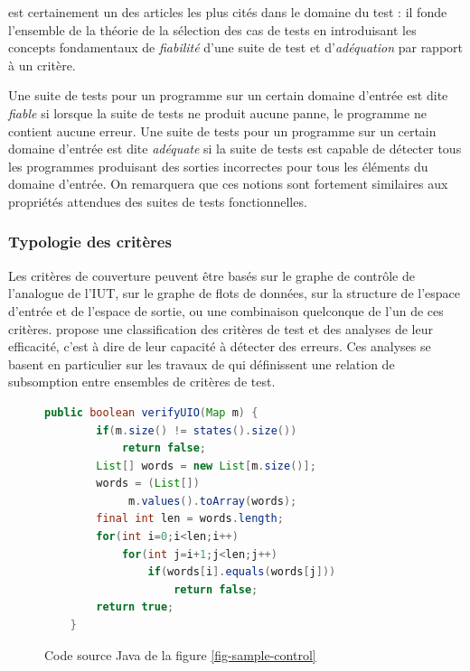 \cite{goodenough-test-selection} est certainement un des articles les
plus cit\'es dans le domaine du test : il fonde l'ensemble de la
th\'eorie de la s\'election des cas de tests en introduisant les
concepts fondamentaux de \emph{fiabilit\'e} d'une suite de test et
d'\emph{ad\'equation}  par rapport \`a un crit\`ere. 

Une suite de tests pour un programme sur un certain domaine
d'entr\'ee est dite \emph{fiable} si lorsque la suite de tests ne
produit aucune panne, le programme ne contient aucune erreur. 
Une suite de tests pour un programme sur un certain domaine
d'entr\'ee  est dite \emph{ad\'equate} si la suite de tests est capable
de d\'etecter tous les programmes produisant des sorties incorrectes
pour tous les \'el\'ements du domaine d'entr\'ee. On remarquera que
ces notions sont fortement similaires aux propri\'et\'es attendues
des suites de tests fonctionnelles.

\subsubsection{Typologie des crit\`eres}

Les crit\`eres de couverture peuvent \^etre bas\'es sur le graphe
de contr\^ole de l'analogue de l'\textsf{IUT}, sur le graphe de flots de
donn\'ees, sur la structure de l'espace d'entr\'ee et de l'espace de
sortie, ou une combinaison quelconque de l'un de ces crit\`eres.
\cite{zhu-coverage} propose une classification des crit\`eres de test
et des analyses de leur efficacit\'e, c'est \`a dire de leur
capacit\'e \`a d\'etecter des erreurs. Ces analyses se basent en
particulier sur les travaux de \cite{faultdetect} qui d\'efinissent
une relation de subsomption entre ensembles de crit\`eres de test. 

\begin{figure}
    \centering
\begin{lstlisting}[linewidth=.45\textwidth,language=Java]
    public boolean verifyUIO(Map m) {
        if(m.size() != states().size())
            return false;
        List[] words = new List[m.size()];
        words = (List[]) 
             m.values().toArray(words);
        final int len = words.length;
        for(int i=0;i<len;i++)
            for(int j=i+1;j<len;j++)
                if(words[i].equals(words[j]))
                    return false;
        return true;
    }
\end{lstlisting}
    
    \caption{Code source Java de la figure \ref{fig-sample-control}}
    \label{fig-source-sample-control}
\end{figure}

